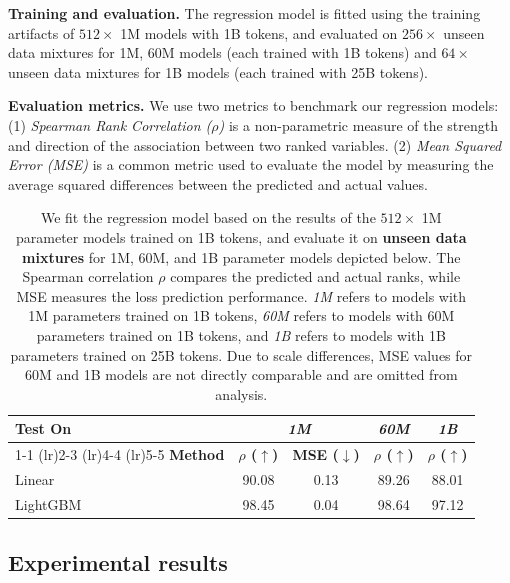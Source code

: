 \documentclass{article}
\theoremstyle{definition}
\theoremstyle{remark}
\begin{document}
\textbf{Training and evaluation.}\;\;
The regression model is fitted using the training artifacts of $512 \times$ 1M models with 1B tokens, and evaluated on $256 \times$ unseen data mixtures for 1M, 60M models (each trained with 1B tokens) and $64 \times$ unseen data mixtures for 1B models (each trained with 25B tokens).

\textbf{Evaluation metrics.}\;\;
We use two metrics to benchmark our regression models: (1) \textit{Spearman Rank Correlation ($\rho$)} is a non-parametric measure of the strength and direction of the association between two ranked variables. (2) \textit{Mean Squared Error (MSE)} is a common metric used to evaluate the model by measuring the average squared differences between the predicted and actual values.

\begin{table}[t]
    \centering
    \small
    \caption{We fit the regression model based on the results of the $512 \times$ 1M parameter models trained on 1B tokens, and evaluate it on \textbf{unseen data mixtures} for 1M, 60M, and 1B parameter models depicted below. The Spearman correlation $\rho$ compares the predicted and actual ranks, while MSE measures the loss prediction performance. \textit{1M} refers to models with 1M parameters trained on 1B tokens, \textit{60M} refers to models with 60M parameters trained on 1B tokens, and \textit{1B} refers to models with 1B parameters trained on 25B tokens. Due to scale differences, MSE values for 60M and 1B models are not directly comparable and are omitted from analysis.}
    \label{tab:linear_vs_lightgbm}
    \vspace{1mm}
    \begin{tabular}{lcccc}
        \toprule
        {Test On} & \multicolumn{2}{c}{\textit{1M}} & {\textit{60M}} & {\textit{1B}} \\
        
        \cmidrule(lr){1-1} \cmidrule(lr){2-3} \cmidrule(lr){4-4} \cmidrule(lr){5-5}
        \textbf{Method} & \textbf{$\rho$ ($\uparrow$)} & \textbf{MSE ($\downarrow$)} & \textbf{$\rho$ ($\uparrow$)} & \textbf{$\rho$ ($\uparrow$)} \\
        \midrule
        Linear & 90.08 & 0.13  & 89.26  & 88.01 \\
        {LightGBM} & {98.45} & {0.04} & {98.64}  & {97.12} \\
        \bottomrule
    \end{tabular}
\end{table}

\subsection{Experimental results}\label{sec:regression_results}
\end{document}
